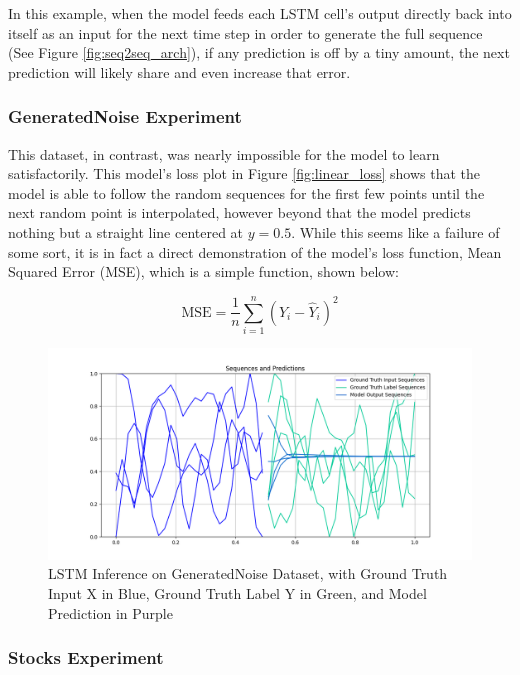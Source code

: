 \documentclass{scrartcl}
\begin{document}
In this example, when the
model feeds each LSTM cell's output directly back into itself as an input for
the next time step in order to generate the full sequence (See Figure
\ref{fig:seq2seq_arch}), if any prediction is off by a tiny amount, the next
prediction will likely share and even increase that error. 

\subsubsection{GeneratedNoise Experiment}
\label{subsubsec:generated_noise}

This dataset, in contrast, was nearly impossible for the model to learn
satisfactorily. This model's loss plot in Figure \ref{fig:linear_loss} shows
that the model is able to follow the random sequences for the first few points
until the next random point is interpolated, however beyond that the model
predicts nothing but a straight line centered at $y = 0.5$. While this seems
like a failure of some sort, it is in fact a direct demonstration of the model's
loss function, Mean Squared Error (MSE), which is a simple function, shown below: 

\begin{equation}
	\text{MSE} = \frac{1}{n} \sum_{i = 1}^n ( Y_i - \hat{Y}_i )^2
	 \label{eq:mseloss}
\end{equation}

\begin{figure}[H]
	\centering
	\includegraphics[width=1\textwidth]{inferences/noise/3layer_s13.png}
	\caption{LSTM Inference on GeneratedNoise Dataset, with Ground Truth Input X in Blue, Ground Truth Label Y in Green, and Model Prediction in Purple}
	\label{inf:lstm_noise_inference}
\end{figure}

\subsubsection{Stocks Experiment}
\label{subsubsec:stocks}
\end{document}
